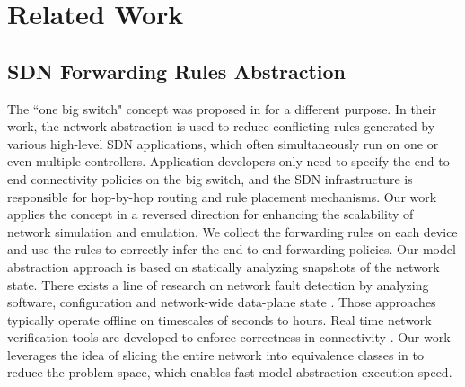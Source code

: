 \section{Related Work}
\label{Sec:relatedwork}

\subsection{SDN Forwarding Rules Abstraction}

The ``one big switch" concept was proposed in \cite{OneBigSwitchAbstraction} for a different purpose. In their work, the network abstraction is used to reduce conflicting rules generated by various high-level SDN applications, which often simultaneously run on one or even multiple controllers. Application developers only need to specify the end-to-end connectivity policies on the big switch, and the SDN infrastructure is responsible for hop-by-hop routing and rule placement mechanisms.
Our work applies the concept in a reversed direction for enhancing the scalability of network simulation and emulation. We collect the forwarding rules on each device and use the rules to correctly infer the end-to-end forwarding policies.
Our model abstraction approach is based on statically analyzing snapshots of the network state. There exists a line of research on network fault detection by analyzing software, configuration and network-wide data-plane state \cite{Al-Shaer2010,Al-Shaer2009,Anteater2011,xz+05}. Those approaches typically operate offline on timescales of seconds to hours. Real time network verification tools are developed to enforce correctness in connectivity \cite{NetPlumber2013,Veriflow}. Our work leverages the idea of slicing the entire network into equivalence classes in \cite{Veriflow} to reduce the problem space, which enables fast model abstraction execution speed.



